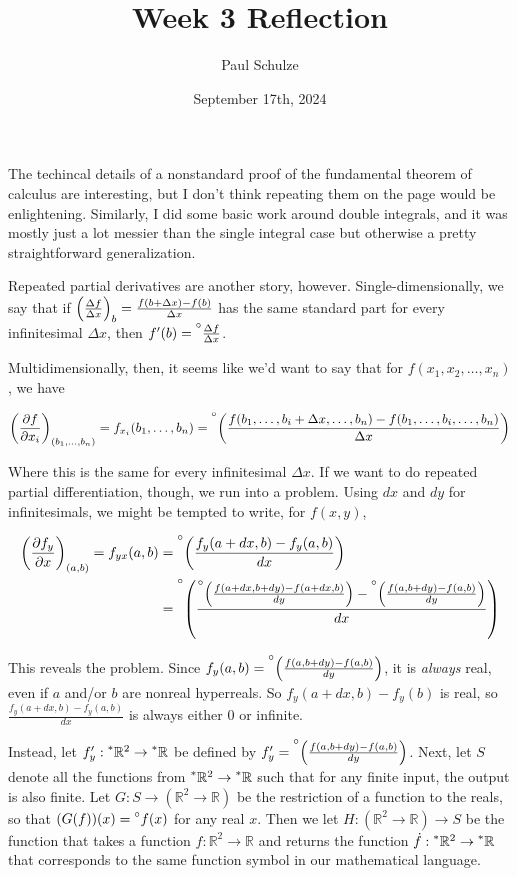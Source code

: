 \documentclass{article}
\title{Week 3 Reflection}
\author{Paul Schulze}
\date{September 17th, 2024}
\newcommand{\st}[1]{\prescript{\circ}{}{#1}}
\newcommand{\hr}{\prescript{*}{}{\mathbb{R}}}
\newcommand{\del}{\partial}
\begin{document}
\maketitle

The techincal details of a nonstandard proof of the fundamental theorem of calculus are interesting, but I don't think repeating them on the page would be enlightening. Similarly, I did some basic work around double integrals, and it was mostly just a lot messier than the single integral case but otherwise a pretty straightforward generalization.

Repeated partial derivatives are another story, however. Single-dimensionally, we say that if $\left(\frac{\Delta f}{\Delta x}\right)_b = \\ \frac{f(b+\Delta x) - f(b)}{\Delta x}$ has the same standard part for every infinitesimal $\Delta x$, then $f'(b)= \st{\frac{\Delta f}{\Delta x}}$.

Multidimensionally, then, it seems like we'd want to say that for $f(x_1, x_2, \ldots, x_n)$, we have 

\[\left(\frac{\partial f}{\partial x_i}\right)_{(b_1, \ldots, b_n)} = f_{x_i}(b_1, \ldots, b_n) = \st{\left(\frac{f(b_1, \ldots, b_i + \Delta x, \ldots, b_n) - f(b_1, \ldots, b_i, \ldots, b_n)}{\Delta x}\right)}\]

Where this is the same for every infinitesimal $\Delta x$. If we want to do repeated partial differentiation, though, we run into a problem. Using $dx$ and $dy$ for infinitesimals, we might be tempted to write, for $f(x,y)$,

\begin{align*}
\left(\frac{\del f_y}{\del x}\right)_{(a, b)} = f_{yx}(a, b) &= \st{\left(\frac{f_y(a + dx, b) - f_y(a, b)}{dx}\right)} \\
&= \st{\left(\frac{\st{\left(\frac{f(a+dx, b+dy) - f(a+dx, b)}{dy}\right)} - \st{\left(\frac{f(a,b+dy)-f(a,b)}{dy}\right)}}{dx}\right)}
\end{align*}

This reveals the problem. Since $f_y(a,b) = \st{\left(\frac{f(a,b+dy)-f(a,b)}{dy}\right)}$, it is \textit{always} real, even if $a$ and/or $b$ are nonreal hyperreals. So $f_y(a+dx,b)-f_y(b)$ is real, so $\frac{f_y(a+dx,b)-f_y(a,b)}{dx}$ is always either $0$ or infinite.

Instead, let $f_y': \hr^2 \to \hr$ be defined by $f_y' = \st{\left(\frac{f(a,b+dy)-f(a,b)}{dy}\right)}$. Next, let $S$ denote all the functions from $\hr^2 \to \hr$ such that for any finite input, the output is also finite. Let $G: S \to (\mathbb{R}^2 \to \mathbb{R})$ be the restriction of a function to the reals, so that $(G(f))(x) = \st f(x)$ for any real $x$. Then we let $H: (\mathbb{R}^2 \to \mathbb{R}) \to S$ be the function that takes a function $f: \mathbb{R}^2 \to \mathbb{R}$ and returns the function $\dot{f}: \hr^2 \to \hr$ that corresponds to the same function symbol in our mathematical language. 
\end{document}
